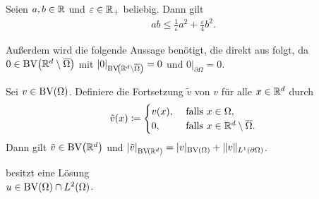 \begin{lemma}
  \label{lem:young}
  Seien $a,b\in\mathbb{R}$ und $\varepsilon\in\mathbb{R}_+$ beliebig. Dann gilt
  \begin{align*}
    ab\leq\frac{1}{\varepsilon}a^2+\frac{\varepsilon}{4}b^2. 
  \end{align*}
\end{lemma}

Außerdem wird die folgende Aussage benötigt, die direkt aus \cite[S. 183,
Theorem 1]{EG92} folgt, da
$0\in\textup{BV}\!\left(\mathbb{R}^d\setminus\overline\Omega\right)$ mit
$|0|_{\textup{BV}\!\left(\mathbb{R}^d\setminus\overline\Omega\right)}=0$ und
$0|_{\partial\Omega}=0$.

\begin{lemma}
  \label{lem:bvExtension}
  Sei $v\in\textup{BV}(\Omega)$.
  Definiere die Fortsetzung $\tilde{v}$ von $v$ für alle $x\in\mathbb{R}^d$ durch
  \begin{align*}
    \tilde{v}(x)\coloneqq
    \begin{cases}
      v(x),  &\text{ falls } x\in\Omega,\\
      0,     &\text{ falls } x\in\mathbb{R}^d\setminus\overline\Omega.
    \end{cases} 
  \end{align*}
  Dann gilt $\tilde{v}\in\textup{BV}\!\left(\mathbb{R}^d\right)$ und
  $\left|\tilde{v}\right|_{\textup{BV}\!\left(\mathbb{R}^d\right)}
  = |v|_{\textup{BV}(\Omega)}+\Vert v\Vert_{L^1(\partial\Omega)}$.
\end{lemma}

\begin{theorem}
  \label{thm:contProblemExistence}
   besitzt eine Lösung \\$u\in\textup{BV}(\Omega)\cap
  L^2(\Omega)$.
\end{theorem}

